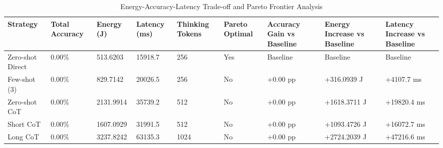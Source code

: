 \begin{table}
\caption{Energy-Accuracy-Latency Trade-off and Pareto Frontier Analysis}
\label{tab:tradeoff_comparison}
\begin{tabular}{lllllllll}
\toprule
Strategy & Total Accuracy & Energy (J) & Latency (ms) & Thinking Tokens & Pareto Optimal & Accuracy Gain vs Baseline & Energy Increase vs Baseline & Latency Increase vs Baseline \\
\midrule
Zero-shot Direct & 0.00\% & 513.6203 & 15918.7 & 256 & Yes & Baseline & Baseline & Baseline \\
Few-shot (3) & 0.00\% & 829.7142 & 20026.5 & 256 & No & +0.00 pp & +316.0939 J & +4107.7 ms \\
Zero-shot CoT & 0.00\% & 2131.9914 & 35739.2 & 512 & No & +0.00 pp & +1618.3711 J & +19820.4 ms \\
Short CoT & 0.00\% & 1607.0929 & 31991.5 & 512 & No & +0.00 pp & +1093.4726 J & +16072.7 ms \\
Long CoT & 0.00\% & 3237.8242 & 63135.3 & 1024 & No & +0.00 pp & +2724.2039 J & +47216.6 ms \\
\bottomrule
\end{tabular}
\end{table}
